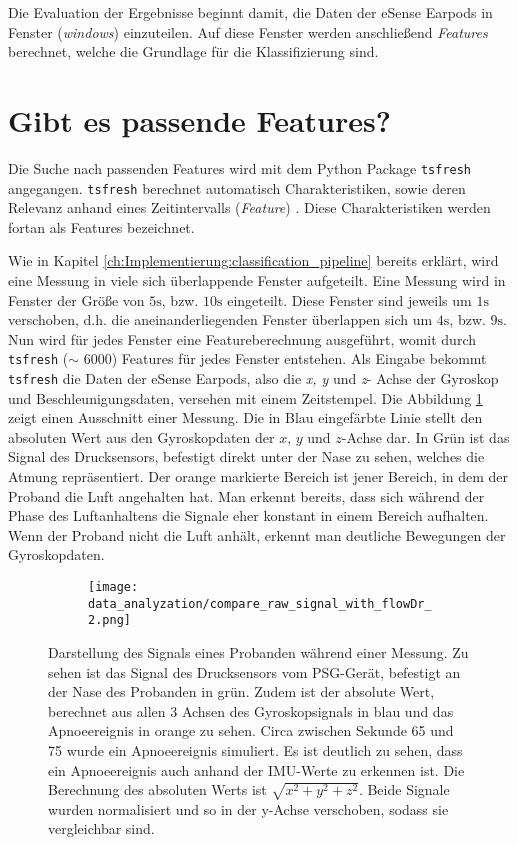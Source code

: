 Die Evaluation der Ergebnisse beginnt damit, die Daten der eSense Earpods in Fenster (\textit{windows}) einzuteilen.
Auf diese Fenster werden anschließend \textit{Features} berechnet, welche die Grundlage für die Klassifizierung sind.

\newpage 

\section{Gibt es passende Features?}
Die Suche nach passenden Features wird mit dem Python Package \texttt{tsfresh} angegangen.
\texttt{tsfresh} berechnet automatisch Charakteristiken, sowie deren Relevanz anhand eines Zeitintervalls (\textit{Feature}) \cite{TsfreshTsfresh12}.
Diese Charakteristiken werden fortan als Features bezeichnet.

Wie in Kapitel \ref{ch:Implementierung:classification_pipeline} bereits erklärt, wird eine Messung in viele sich überlappende Fenster aufgeteilt. 
Eine Messung wird in Fenster der Größe von $5\si{\s}$, bzw. $10\si{\s}$ eingeteilt.
Diese Fenster sind jeweils um $1\si{\s}$ verschoben, d.h. die aneinanderliegenden Fenster überlappen sich um $4\si{\s}$, bzw. $9\si{\s}$.
Nun wird für jedes Fenster eine Featureberechnung ausgeführt, womit durch \texttt{tsfresh} ($\sim$ 6000) Features für jedes Fenster entstehen.
Als Eingabe bekommt \texttt{tsfresh} die Daten der eSense Earpods, also die \textit{x, y} und \textit{z}- Achse der Gyroskop und Beschleunigungsdaten, versehen mit einem Zeitstempel. 
Die Abbildung \ref{evaluation:rawPlot} zeigt einen Ausschnitt einer Messung. 
Die in Blau eingefärbte Linie stellt den absoluten Wert aus den Gyroskopdaten der $x$, $y$ und $z$-Achse dar.
In Grün ist das Signal des Drucksensors, befestigt direkt unter der Nase zu sehen, welches die Atmung repräsentiert.
Der orange markierte Bereich ist jener Bereich, in dem der Proband die Luft angehalten hat. 
Man erkennt bereits, dass sich während der Phase des Luftanhaltens die Signale eher konstant in einem Bereich aufhalten.
Wenn der Proband nicht die Luft anhält, erkennt man deutliche Bewegungen der Gyroskopdaten. 

\begin{figure}[ht]
  \centering
  \begin{subfigure}{0.7\textwidth}
      \texttt{[image: data\_analyzation/compare\_raw\_signal\_with\_flowDr\_2.png]}
    \end{subfigure}
  \caption{Darstellung des Signals eines Probanden während einer Messung. Zu sehen ist das Signal des Drucksensors vom PSG-Gerät, befestigt an der Nase des Probanden in grün. Zudem ist der absolute Wert, berechnet aus allen 3 Achsen des Gyroskopsignals in blau und das Apnoeereignis in orange zu sehen. Circa zwischen Sekunde 65 und 75 wurde ein Apnoeereignis simuliert. Es ist deutlich zu sehen, dass ein Apnoeereignis auch anhand der IMU-Werte zu erkennen ist. Die Berechnung des absoluten Werts ist $\sqrt{x^2+y^2+z^2}$. Beide Signale wurden normalisiert und so in der y-Achse verschoben, sodass sie vergleichbar sind.}
  \label{evaluation:rawPlot}
\end{figure}

